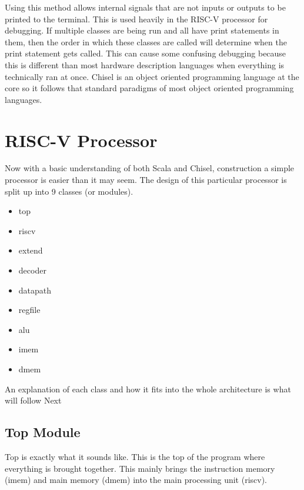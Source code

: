 \documentclass[12pt, letterpaper]{report}
\begin{document}
Using this method allows internal signals that are not inputs or outputs to be printed to the terminal. This is used heavily in 
the RISC-V processor for debugging. If multiple classes are being run and all have print statements in them, then the order in 
which these classes are called will determine when the print statement gets called. This can cause some confusing debugging because 
this is different than most hardware description languages when everything is technically ran at once. Chisel is an object oriented 
programming language at the core so it follows that standard paradigms of most object oriented programming languages.


\chapter{RISC-V Processor}
Now with a basic understanding of both Scala and Chisel, construction a simple processor is easier than it may seem. The design of 
this particular processor is split up into 9 classes (or modules).
\begin{itemize}
   \item top
   \item riscv
   \item extend
   \item decoder
   \item datapath
   \item regfile
   \item alu
   \item imem
   \item dmem
\end{itemize}

An explanation of each class and how it fits into the whole architecture is what will follow Next
\section{Top Module}
Top is exactly what it sounds like. This is the top of the program where everything is brought together. This mainly brings the instruction
memory (imem) and main memory (dmem) into the main processing unit (riscv).
\end{document}
